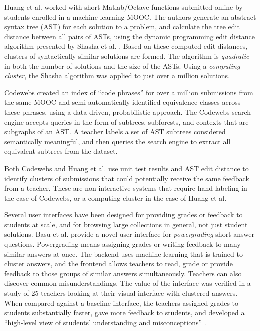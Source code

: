 \documentclass{sigchi}
\begin{document}
Huang et al. \citeyear{MOOCshop} worked with short Matlab/Octave functions submitted online by students enrolled in a machine learning MOOC. The authors generate an abstract syntax tree (AST) for each solution to a problem, and calculate the tree edit distance between all pairs of ASTs, using the dynamic programming edit distance algorithm presented by Shasha et al. \citeyear{shasha1994exact}. Based on these computed edit distances, clusters of syntactically similar solutions are formed. The algorithm is \emph{quadratic} in both the number of solutions and the size of the ASTs. Using a \emph{computing cluster}, the Shasha algorithm was applied to just over a million solutions. 

Codewebs \cite{codewebs} created an index of ``code phrases'' for over a million submissions from the same MOOC and semi-automatically identified equivalence classes across these phrases, using a data-driven, probabilistic approach. The Codewebs search engine accepts queries in the form of subtrees, subforests, and contexts that are subgraphs of an AST. A teacher labels a set of AST subtrees considered semantically meaningful, and then queries the search engine to extract all equivalent subtrees from the dataset. 

Both Codewebs \cite{codewebs} and Huang et al. \citeyear{MOOCshop} use unit test results and AST edit distance to identify clusters of submissions that could potentially receive the same feedback from a teacher. These are non-interactive systems that require hand-labeling in the case of Codewebs, or a computing cluster in the case of Huang et al. 

Several user interfaces have been designed for providing grades or feedback to students at scale, and for browsing large collections in general, not just student solutions. Basu et al. \citeyear{basupowergrading} provide a novel user interface for {\it powergrading} short-answer questions. Powergrading means assigning grades or writing feedback to many similar answers at once. The backend uses machine learning that is trained to cluster answers, and the frontend allows teachers to read, grade or provide feedback to those groups of similar answers simultaneously. Teachers can also discover common misunderstandings. The value of the interface was verified in a study of 25 teachers looking at their visual interface with clustered answers. When compared against a baseline interface, the teachers assigned grades to students substantially faster, gave more feedback to students, and developed a ``high-level view of students' understanding and misconceptions'' \cite{basuDivideAndConquer}.
\end{document}
